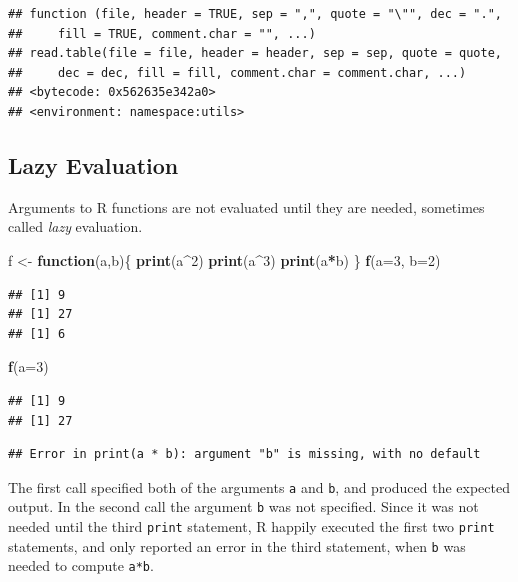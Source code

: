 \documentclass[
]{krantz}
\newenvironment{Shaded}{\begin{snugshade}}{\end{snugshade}}
\newcommand{\ControlFlowTok}[1]{\textcolor[rgb]{0.13,0.29,0.53}{\textbf{#1}}}
\newcommand{\DataTypeTok}[1]{\textcolor[rgb]{0.13,0.29,0.53}{#1}}
\newcommand{\DecValTok}[1]{\textcolor[rgb]{0.00,0.00,0.81}{#1}}
\newcommand{\KeywordTok}[1]{\textcolor[rgb]{0.13,0.29,0.53}{\textbf{#1}}}
\newcommand{\NormalTok}[1]{#1}
\newcommand{\OperatorTok}[1]{\textcolor[rgb]{0.81,0.36,0.00}{\textbf{#1}}}
\newcommand{\StringTok}[1]{\textcolor[rgb]{0.31,0.60,0.02}{#1}}
\begin{document}
\begin{verbatim}
## function (file, header = TRUE, sep = ",", quote = "\"", dec = ".", 
##     fill = TRUE, comment.char = "", ...) 
## read.table(file = file, header = header, sep = sep, quote = quote, 
##     dec = dec, fill = fill, comment.char = comment.char, ...)
## <bytecode: 0x562635e342a0>
## <environment: namespace:utils>
\end{verbatim}

\hypertarget{lazy-evaluation}{%
\subsection{Lazy Evaluation}\label{lazy-evaluation}}

Arguments to R functions are not evaluated until they are needed, sometimes called \emph{lazy} evaluation.

\begin{Shaded}
\begin{Highlighting}[]
\NormalTok{f \textless{}{-}}\StringTok{ }\ControlFlowTok{function}\NormalTok{(a,b)\{}
    \KeywordTok{print}\NormalTok{(a}\OperatorTok{\^{}}\DecValTok{2}\NormalTok{)}
    \KeywordTok{print}\NormalTok{(a}\OperatorTok{\^{}}\DecValTok{3}\NormalTok{)}
    \KeywordTok{print}\NormalTok{(a}\OperatorTok{*}\NormalTok{b)}
\NormalTok{\}}
\KeywordTok{f}\NormalTok{(}\DataTypeTok{a=}\DecValTok{3}\NormalTok{, }\DataTypeTok{b=}\DecValTok{2}\NormalTok{)}
\end{Highlighting}
\end{Shaded}

\begin{verbatim}
## [1] 9
## [1] 27
## [1] 6
\end{verbatim}

\begin{Shaded}
\begin{Highlighting}[]
\KeywordTok{f}\NormalTok{(}\DataTypeTok{a=}\DecValTok{3}\NormalTok{)}
\end{Highlighting}
\end{Shaded}

\begin{verbatim}
## [1] 9
## [1] 27
\end{verbatim}

\begin{verbatim}
## Error in print(a * b): argument "b" is missing, with no default
\end{verbatim}

The first call specified both of the arguments \texttt{a} and \texttt{b}, and produced the expected output. In the second call the argument \texttt{b} was not specified. Since it was not needed until the third \texttt{print} statement, R happily executed the first two \texttt{print} statements, and only reported an error in the third statement, when \texttt{b} was needed to compute \texttt{a*b}.
\end{document}
